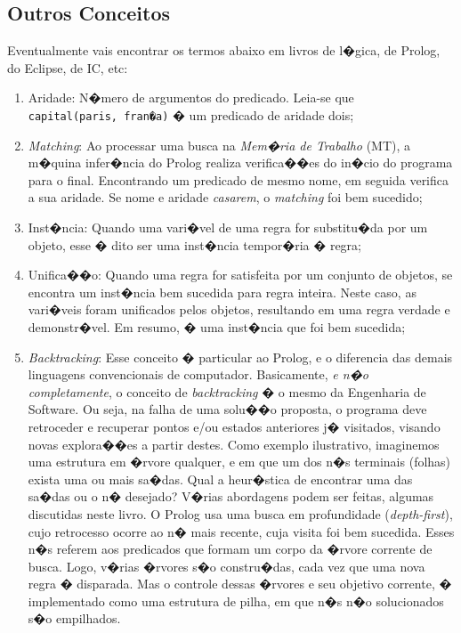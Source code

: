 \documentclass[final,a4paper]{article}
\begin{document}
\newpage
\subsection{Outros Conceitos}

   Eventualmente vais encontrar os termos abaixo em 
livros de l�gica, de Prolog, do Eclipse, de IC, etc:

\begin{enumerate}
\item Aridade: N�mero
 de argumentos do predicado.
 Leia-se que\\
 \texttt{capital(paris, fran�a)}
 � um predicado de aridade dois;

\item {\em Matching}: Ao processar uma busca na
{\em Mem�ria de Trabalho} (MT), a m�quina infer�ncia do Prolog
realiza verifica��es do in�cio do programa para o final.
Encontrando um predicado de mesmo nome, em
seguida verifica a sua aridade. Se nome e aridade
 {\em casarem}, o {\em matching} foi bem sucedido;

\item Inst�ncia: Quando uma vari�vel de uma regra for
 substitu�da por um objeto, esse � dito ser uma inst�ncia
 tempor�ria � regra;

\item  Unifica��o: Quando uma regra for satisfeita por
um conjunto de objetos, se encontra um inst�ncia bem
sucedida para regra inteira. Neste caso, as vari�veis foram
 unificados pelos objetos, resultando em uma regra verdade e
 demonstr�vel. Em resumo, � uma inst�ncia que foi bem sucedida;

\item  {\em Backtracking}: Esse conceito � particular ao
Prolog, e o diferencia das demais linguagens convencionais
de computador. Basicamente, {\em e n�o completamente},
o conceito de {\em backtracking} � o mesmo da Engenharia de
 Software. Ou seja, na falha de uma solu��o proposta, o
  programa deve retroceder e recuperar pontos e/ou estados
  anteriores j� visitados, visando novas explora��es a partir destes.
  Como exemplo ilustrativo, imaginemos uma estrutura em �rvore
  qualquer, e em que um dos n�s terminais (folhas) exista uma ou
  mais sa�das. Qual a heur�stica de encontrar uma das sa�das ou o
   n� desejado?  V�rias abordagens podem ser feitas, algumas discutidas neste livro. O Prolog usa uma busca em
   profundidade ({\em depth-first}), cujo retrocesso ocorre ao
   n� mais recente, cuja visita foi bem sucedida.
   Esses n�s referem aos predicados que formam um
   corpo da �rvore corrente de busca. Logo, v�rias �rvores
   s�o constru�das, cada vez que uma nova regra � disparada.
   Mas o controle dessas �rvores e seu objetivo corrente, �
   implementado como uma estrutura de pilha, em que n�s
   n�o solucionados s�o empilhados.
\end{enumerate}
\end{document}

